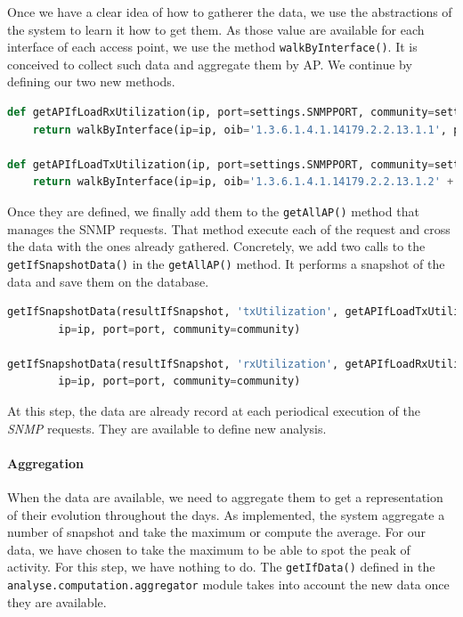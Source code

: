 Once we have a clear idea of how to gatherer the data, we use the abstractions of the system to learn it how to get them. As those value are available for each interface of each access point, we use the method \texttt{walkByInterface()}. It is conceived to collect such data and aggregate them by AP. We continue by defining our two new methods.\\
\begin{lstlisting}[language=Python, frame=single,breaklines=true,caption={Misleading Error Message}]
def getAPIfLoadRxUtilization(ip, port=settings.SNMPPORT, community=settings.SNMPCOMMUNITY, ap=''):
	return walkByInterface(ip=ip, oib='1.3.6.1.4.1.14179.2.2.13.1.1', port=port, community=community)

def getAPIfLoadTxUtilization(ip, port=settings.SNMPPORT, community=settings.SNMPCOMMUNITY, ap=''):
	return walkByInterface(ip=ip, oib='1.3.6.1.4.1.14179.2.2.13.1.2' + ap, port=port, community=community)
\end{lstlisting}

Once they are defined, we finally add them to the \texttt{getAllAP()} method that manages the SNMP requests. That method execute each of the request and cross the data with the ones already gathered. Concretely, we add two calls to the \texttt{getIfSnapshotData()} in the \texttt{getAllAP()} method. It performs a snapshot of the data and save them on the database.\\

\begin{lstlisting}[language=Python, frame=single,breaklines=true,caption={Misleading Error Message}]
getIfSnapshotData(resultIfSnapshot, 'txUtilization', getAPIfLoadTxUtilization, 
		ip=ip, port=port, community=community)

getIfSnapshotData(resultIfSnapshot, 'rxUtilization', getAPIfLoadRxUtilization, 
		ip=ip, port=port, community=community)		
\end{lstlisting}

At this step, the data are already record at each periodical execution of the \emph{SNMP} requests. They are available to define new analysis.

\paragraph*{Aggregation} When the data are available, we need to aggregate them to get a representation of their evolution throughout the days. As implemented, the system aggregate a number of snapshot and take the maximum or compute the average. For our data, we have chosen to take the maximum to be able to spot the peak of activity. For this step, we have nothing to do. The \texttt{getIfData()} defined in the \texttt{analyse.computation.aggregator} module takes into account the new data once they are available.


